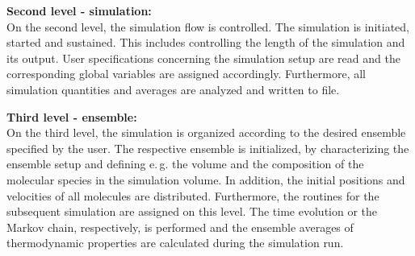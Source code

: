 \textbf{Second level - simulation:}\\
On the second level, the simulation flow is controlled. The simulation is initiated, started and sustained. This includes controlling the length of the simulation and its output. User specifications concerning the simulation setup are read and the corresponding  global variables are assigned accordingly. Furthermore, all simulation quantities and averages are analyzed and written to file.

\textbf{Third level - ensemble:}\\
On the third level, the simulation is organized according to the desired ensemble specified by the user. The respective ensemble is initialized, by characterizing the ensemble setup and defining e.\,g. the volume and the composition of the molecular species in the simulation volume. In addition, the initial positions and velocities of all molecules are distributed. Furthermore, the routines for the subsequent simulation are assigned on this level. The time evolution or the Markov chain, respectively, is performed and the ensemble averages of thermodynamic properties are calculated during the simulation run. 

